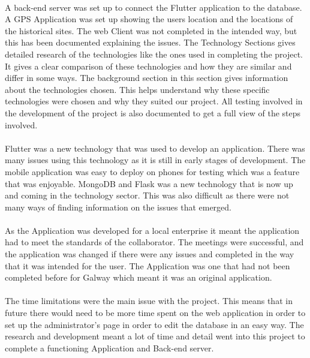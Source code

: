\paragraph{}A back-end server was set up to connect the Flutter application to the database. A GPS Application was set up showing the users location and the locations of the historical sites. The web Client was not completed in the intended way, but this has been documented explaining the issues. The Technology Sections gives detailed research of the technologies like the ones used in completing the project. It gives a clear comparison of these technologies and how they are similar and differ in some ways. The background section in this section gives information about the technologies chosen. This helps understand why these specific technologies were chosen and why they suited our project. All testing involved in the development of the project is also documented to get a full view of the steps involved.
\paragraph{}Flutter was a new technology that was used to develop an application. There was many issues using this technology as it is still in early stages of development. The mobile application was easy to deploy on phones for testing which was a feature that was enjoyable. MongoDB and Flask was a new technology that is now up and coming in the technology sector. This was also difficult as there were not many ways of finding information on the issues that emerged.
\paragraph{}As the Application was developed for a local enterprise it meant the application had to meet the standards of the collaborator. The meetings were successful, and the application was changed if there were any issues and completed in the way that it was intended for the user. The Application was one that had not been completed before for Galway which meant it was an original application.
\paragraph{}The time limitations were the main issue with the project. This means that in future there would need to be more time spent on the web application in order to set up the administrator’s page in order to edit the database in an easy way. The research and development meant a lot of time and detail went into this project to complete a functioning Application and Back-end server.
